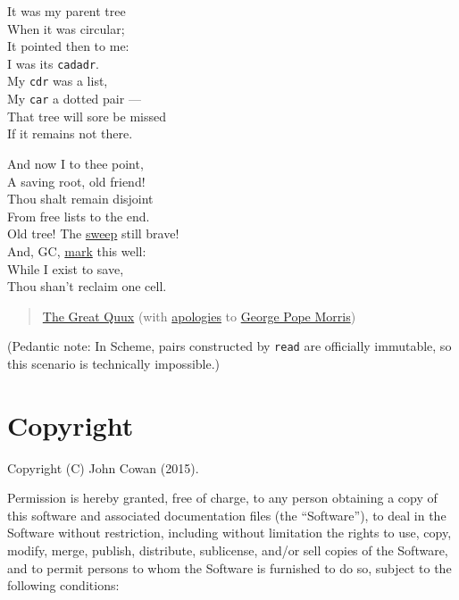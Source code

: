 It was my parent tree\\
When it was circular;\\
It pointed then to me:\\
I was its \texttt{cadadr}.\\
My \texttt{cdr} was a list,\\
My \texttt{car} a dotted pair ---\\
That tree will sore be missed\\
If it remains not there.

And now I to thee point,\\
A saving root, old friend!\\
Thou shalt remain disjoint\\
From free lists to the end.\\
Old tree! The
\href{https://en.wikipedia.org/wiki/Tracing_garbage_collection\#Na.C3.AFve_mark-and-sweep}{sweep}
still brave!\\
And, GC,
\href{https://en.wikipedia.org/wiki/Tracing_garbage_collection\#Na.C3.AFve_mark-and-sweep}{mark}
this well:\\
While I exist to save,\\
Thou shan't reclaim one cell.

\begin{quote}
\href{https://en.wikipedia.org/wiki/Guy_L._Steele,_Jr.}{The Great Quux}
(with \href{http://www.bartleby.com/248/131.html}{apologies} to
\href{https://en.wikipedia.org/wiki/George_Pope_Morris}{George Pope
Morris})
\end{quote}

(Pedantic note: In Scheme, pairs constructed by \texttt{read} are
officially immutable, so this scenario is technically impossible.)

\section{Copyright}\label{copyright}

Copyright (C) John Cowan (2015).

Permission is hereby granted, free of charge, to any person obtaining a
copy of this software and associated documentation files (the
``Software''), to deal in the Software without restriction, including
without limitation the rights to use, copy, modify, merge, publish,
distribute, sublicense, and/or sell copies of the Software, and to
permit persons to whom the Software is furnished to do so, subject to
the following conditions:


